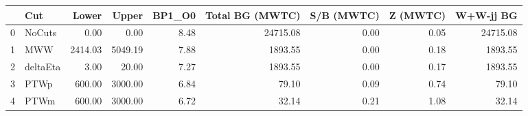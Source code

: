\begin{tabular}{llrrrrrrr}
\toprule
{} &       Cut &   Lower &   Upper &  BP1\_O0 &  Total BG (MWTC) &  S/B (MWTC) &  Z (MWTC) &  W+W-jj BG  \\
\midrule
0 &    NoCuts &    0.00 &    0.00 &    8.48 &         24715.08 &        0.00 &      0.05 &    24715.08 \\
1 &       MWW & 2414.03 & 5049.19 &    7.88 &          1893.55 &        0.00 &      0.18 &     1893.55 \\
2 &  deltaEta &    3.00 &   20.00 &    7.27 &          1893.55 &        0.00 &      0.17 &     1893.55 \\
3 &      PTWp &  600.00 & 3000.00 &    6.84 &            79.10 &        0.09 &      0.74 &       79.10 \\
4 &      PTWm &  600.00 & 3000.00 &    6.72 &            32.14 &        0.21 &      1.08 &       32.14 \\
\bottomrule
\end{tabular}
